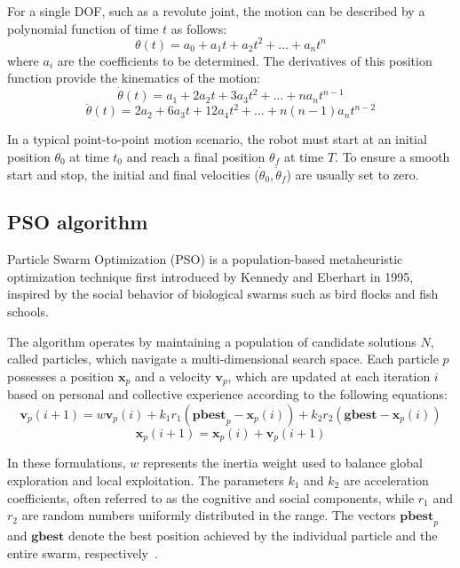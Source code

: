 \documentclass[runningheads]{llncs}
\begin{document}
For a single DOF, such as a revolute joint, the motion can be described by a polynomial function of time $t$ as follows:
\begin{equation}
    \theta(t) = a_0 + a_1 t + a_2 t^2 + \dots + a_n t^n
\end{equation}
where $a_i$ are the coefficients to be determined. The derivatives of this position function provide the kinematics of the motion:
\begin{equation}
    \dot{\theta}(t) = a_1 + 2 a_2 t + 3 a_3 t^2 + \dots + n a_n t^{n-1}
\end{equation}
\begin{equation}
    \ddot{\theta}(t) = 2 a_2 + 6 a_3 t + 12 a_4 t^2 + \dots + n(n-1) a_n t^{n-2}
\end{equation}

In a typical point-to-point motion scenario, the robot must start at an initial position $\theta_0$ at time $t_0$ and reach a final position $\theta_f$ at time $T$. To ensure a smooth start and stop, the initial and final velocities ($\dot{\theta}_0, \dot{\theta}_f$) are usually set to zero.

\subsection{PSO algorithm}
Particle Swarm Optimization (PSO) is a population-based metaheuristic optimization technique first introduced by Kennedy and Eberhart in 1995, inspired by the social behavior of biological swarms such as bird flocks and fish schools.

The algorithm operates by maintaining a population of candidate solutions $N$, called particles, which navigate a multi-dimensional search space. Each particle $p$ possesses a position $\textbf{x}_p$ and a velocity $\textbf{v}_p$, which are updated at each iteration $i$ based on personal and collective experience according to the following equations:
\begin{equation}
    \textbf{v}_p(i+1) = w \textbf{v}_p(i) + k_1 r_1 (\textbf{pbest}_p - \textbf{x}_p(i)) + k_2 r_2 (\textbf{gbest} - \textbf{x}_p(i))
\end{equation}
\begin{equation}
    \textbf{x}_p(i+1) = \textbf{x}_p(i) + \textbf{v}_p(i+1)
\end{equation}

In these formulations, $w$ represents the inertia weight used to balance global exploration and local exploitation. The parameters $k_1$ and $k_2$ are acceleration coefficients, often referred to as the cognitive and social components, while $r_1$ and $r_2$ are random numbers uniformly distributed in the range. The vectors $\textbf{pbest}_p$ and $\textbf{gbest}$ denote the best position achieved by the individual particle and the entire swarm, respectively~\cite{ref_pso}.
\end{document}
